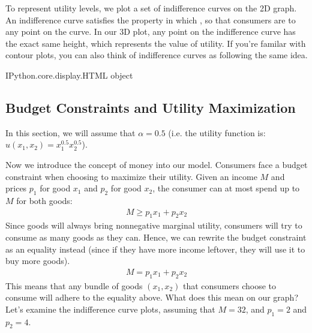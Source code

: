 \documentclass[letterpaper,10pt,english]{jupyterBook}
\begin{document}
\sphinxAtStartPar
To represent utility levels, we plot a set of indifference curves on the 2D graph. An indifference curve satisfies the property in which , so that consumers are  to any point on the curve. In our 3D plot, any point on the indifference curve has the exact same height, which represents the value of utility. If you’re familar with contour plots, you can also think of indifference curves as following the same idea.

\begin{sphinxVerbatim}[commandchars=\\\{\}]
\PYGZlt{}IPython.core.display.HTML object\PYGZgt{}
\end{sphinxVerbatim}


\subsection{Budget Constraints and Utility Maximization}
\label{\detokenize{content/05-utility/budget-constraints:budget-constraints-and-utility-maximization}}\label{\detokenize{content/05-utility/budget-constraints::doc}}
\sphinxAtStartPar
In this section, we will assume that \(\alpha = 0.5\) (i.e. the utility function is: \(u(x_1, x_2) = x_1^{0.5}x_2^{0.5}\)).

\sphinxAtStartPar
Now we introduce the concept of money into our model. Consumers face a budget constraint when choosing to maximize their utility. Given an income \(M\) and prices \(p_1\) for good \(x_1\) and \(p_2\) for good \(x_2\), the consumer can at most spend up to \(M\) for both goods:
\begin{equation*}
\begin{split}M \geq p_1x_1 + p_2x_2\end{split}
\end{equation*}
\sphinxAtStartPar
Since goods will always bring non\sphinxhyphen{}negative marginal utility, consumers will try to consume as many goods as they can. Hence, we can rewrite the budget constraint as an equality instead (since if they have more income leftover, they will use it to buy more goods).
\begin{equation*}
\begin{split}M = p_1x_1 + p_2x_2\end{split}
\end{equation*}
\sphinxAtStartPar
This means that any bundle of goods \((x_1,x_2)\) that consumers choose to consume will adhere to the equality above. What does this mean on our graph? Let’s examine the indifference curve plots, assuming that \(M = 32\), and \(p_1 =2\) and \(p_2 = 4\).
\end{document}
